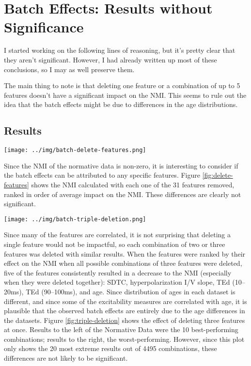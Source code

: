 \documentclass[12pt]{article}
\begin{document}
\section*{Batch Effects: Results without Significance}

I started working on the following lines of reasoning, but it's pretty clear that they aren't significant. However, I had already written up most of these conclusions, so I may as well preserve them.

The main thing to note is that deleting one feature or a combination of up to 5 features doesn't have a significant impact on the NMI. This seems to rule out the idea that the batch effects might be due to differences in the age distributions.

\subsection*{Results}

\begin{figure*}[ht]
  \centering
       \texttt{[image: ../img/batch-delete-features.png]}
         \caption{}
  \label{fig:delete-features}
\end{figure*}

Since the NMI of the normative data is non-zero, it is interesting to consider if the batch effects can be attributed to any specific features. Figure \ref{fig:delete-features} shows the NMI calculated with each one of the 31 features removed, ranked in order of average impact on the NMI. These differences are clearly not significant.

\pagebreak

\begin{figure*}
  \centering
       \texttt{[image: ../img/batch-triple-deletion.png]}
         \caption{}
  \label{fig:triple-deletion}
\end{figure*}

Since many of the features are correlated, it is not surprising that deleting a single feature would not be impactful, so each combination of two or three features was deleted with similar results. When the features were ranked by their effect on the NMI when all possible combinations of three features were deleted, five of the features consistently resulted in a decrease to the NMI (especially when they were deleted together): SDTC, hyperpolarization I/V slope, TEd (10–20ms), TEd (90–100ms), and age. Since distribution of ages in each dataset is different, and since some of the excitability measures are correlated with age, %
it is plausible that the observed batch effects are entirely due to the age differences in the datasets. Figure \ref{fig:triple-deletion} shows the effect of deleting three features at once. Results to the left of the Normative Data were the 10 best-performing combinations; results to the right, the worst-performing. However, since this plot only shows the 20 most extreme results out of 4495 combinations, these differences are not likely to be significant.
\end{document}
